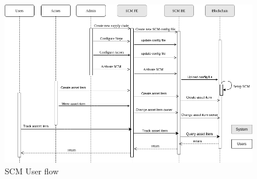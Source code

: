 \begin{figure}[ht]
\begin{center}
  \includegraphics[scale=0.5]{images/SequenceDiagram.png}
\caption{SCM User flow}
\label{fig:sequenceDiagram}
\end{center}
\end{figure}
